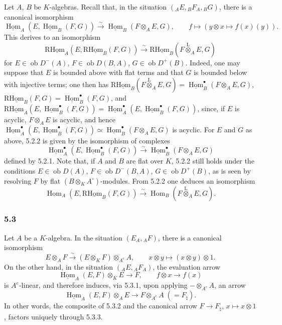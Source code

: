 \documentclass[11pt]{article}
\providecommand{\uHom}{\underline{\Hom}}
\DeclareMathOperator{\Hom}{Hom}
\newcommand{\ob}{\operatorname{ob}}
\providecommand{\lten}{\overset{\mathrm L}{\otimes}}
\providecommand{\Hom}{\operatorname{Hom}}
\providecommand{\ob}{\operatorname{ob}}
\providecommand{\lten}{\overset{\mathrm L}{\otimes}}
\providecommand{\lten}{\overset{\mathrm L}{\otimes}}
\providecommand{\lten}{\overset{\mathrm L}{\otimes}}
\providecommand{\lten}{\overset{\mathrm L}{\otimes}}
\providecommand{\lten}{\overset{\mathrm L}{\otimes}}
\providecommand{\Hom}{\operatorname{Hom}}
\providecommand{\lten}{\overset{\mathrm L}{\otimes}}
\begin{document}
Let $A$, $B$ be $K$-algebras. Recall that, in the situation $({}_AE,{}_BF_A,{}_BG)$, there is a canonical isomorphism
\begin{equation}\tag{5.2.1}
\uHom_A(E,\uHom_B(F,G))\xrightarrow{\sim}\uHom_B(F\otimes_AE,G),\qquad
f\longmapsto (y\otimes x\longmapsto f(x)(y)).
\end{equation}
This derives to an isomorphism
\begin{equation}\tag{5.2.2}
\mathrm{R}\underline{\mathrm{Hom}}_A(E,\mathrm{R}\underline{\mathrm{Hom}}_B(F,G))\xrightarrow{\sim}\mathrm{R}\underline{\mathrm{Hom}}_B(F\lten_AE,G)
\end{equation}
for $E\in\ob D^-(A)$, $F\in\ob D(B,A)$, $G\in\ob D^+(B)$. Indeed, one may suppose that $E$ is bounded above with flat terms and that $G$ is bounded below with injective terms; one then has $\mathrm{R}\underline{\mathrm{Hom}}_B(F\lten_AE,G)=\uHom_B^\bullet(F\otimes_AE,G)$, $\mathrm{R}\underline{\mathrm{Hom}}_B(F,G)=\uHom_B^\bullet(F,G)$, and $\mathrm{R}\underline{\mathrm{Hom}}_A(E,\uHom_B^\bullet(F,G))=\uHom_A^\bullet(E,\uHom_B^\bullet(F,G))$, since, if $E$ is acyclic, $F\otimes_AE$ is acyclic, and hence $\uHom_A^\bullet(E,\uHom_B^\bullet(F,G))\simeq\uHom_B^\bullet(F\otimes_AE,G)$ is acyclic. For $E$ and $G$ as above, 5.2.2 is given by the isomorphism of complexes
\[
\uHom_A^\bullet(E,\uHom_B^\bullet(F,G))\xrightarrow{\sim}\uHom_B^\bullet(F\otimes_AE,G)
\]
defined by 5.2.1. Note that, if $A$ and $B$ are flat over $K$, 5.2.2 still holds under the conditions $E\in\ob D(A)$, $F\in\ob D^-(B,A)$, $G\in\ob D^+(B)$, as is seen by resolving $F$ by flat $(B\otimes_KA^\circ)$-modules. From 5.2.2 one deduces an isomorphism
\begin{equation}\tag{5.2.3}
\Hom_A(E,\mathrm{R}\underline{\mathrm{Hom}}_B(F,G))\xrightarrow{\sim}\Hom_B(F\lten_AE,G).
\end{equation}

\subsubsection*{5.3}

Let $A$ be a $K$-algebra. In the situation $(E_A,{}_AF)$, there is a canonical isomorphism
\begin{equation}\tag{5.3.1}
E\otimes_AF\xrightarrow{\sim}(E\otimes_KF)\otimes_{A^e}A,
\qquad x\otimes y\longmapsto (x\otimes y)\otimes 1.
\end{equation}
On the other hand, in the situation $({}_AE,{}_AF_A)$, the evaluation arrow
\begin{equation}\tag{5.3.2}
\uHom_A(E,F)\otimes_KE\longrightarrow F,
\qquad f\otimes x\longrightarrow f(x)
\end{equation}
is $A^e$-linear, and therefore induces, via 5.3.1, upon applying $-\otimes_{A^e}A$, an arrow
\begin{equation}\tag{5.3.3}
\uHom_A(E,F)\otimes_AE\longrightarrow F\otimes_{A^e}A\;(=F_\natural).
\end{equation}
In other words, the composite of 5.3.2 and the canonical arrow $F\to F_\natural$, $x\mapsto x\otimes 1$, factors uniquely through 5.3.3.
\end{document}
